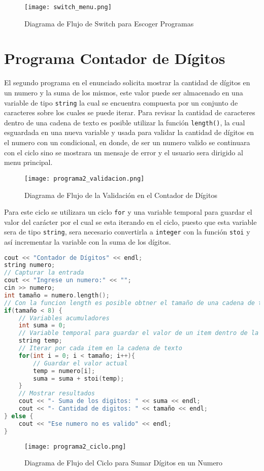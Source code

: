 \documentclass[12pt]{article}
\begin{document}
\begin{figure}[H]
    \caption{Diagrama de Flujo de Switch para Escoger Programas}
    \centering
    \texttt{[image: switch\_menu.png]}
\end{figure}


\section{Programa Contador de Dígitos}

El segundo programa en el enunciado solicita mostrar la cantidad de dígitos en un numero y la suma de los mismos, este valor puede ser almacenado en una variable de tipo \verb+string+ la cual se encuentra compuesta por un conjunto de caracteres sobre los cuales se puede iterar. Para revisar la cantidad de caracteres dentro de una cadena de texto es posible utilizar la función \verb+length()+, la cual esguardada en una nueva variable y usada para validar la cantidad de dígitos en el numero con un condicional, en donde, de ser un numero valido se continuara con el ciclo sino se mostrara un mensaje de error y el usuario sera dirigido al menu principal.

\begin{figure}[H]
    \caption{Diagrama de Flujo de la Validación en el Contador de Dígitos}
    \centering
    \texttt{[image: programa2\_validacion.png]}
\end{figure}

Para este ciclo se utilizara un ciclo \verb+for+ y una variable temporal para guardar el valor del carácter por el cual se esta iterando en el ciclo, puesto que esta variable sera de tipo \verb+string+, sera necesario convertirla a \verb+integer+ con la función \verb+stoi+ y así incrementar la variable con la suma de los dígitos.


\begin{lstlisting}[language=c++]
cout << "Contador de Dígitos" << endl;
string numero;
// Capturar la entrada
cout << "Ingrese un numero:" << "";
cin >> numero;
int tamaño = numero.length();
// Con la funcion length es posible obtner el tamaño de una cadena de texto
if(tamaño < 8) {
    // Variables acumuladores
    int suma = 0;
    // Variable temporal para guardar el valor de un item dentro de la cadena de texto
    string temp;
    // Iterar por cada item en la cadena de texto
    for(int i = 0; i < tamaño; i++){
        // Guardar el valor actual
        temp = numero[i];
        suma = suma + stoi(temp);
    }
    // Mostrar resultados
    cout << "- Suma de los digitos: " << suma << endl;
    cout << "- Cantidad de digitos: " << tamaño << endl;
} else {
    cout << "Ese numero no es valido" << endl;
}
\end{lstlisting}

\begin{figure}[H]
    \caption{Diagrama de Flujo del Ciclo para Sumar Dígitos en un Numero}
    \centering
    \texttt{[image: programa2\_ciclo.png]}
\end{figure}
\end{document}
